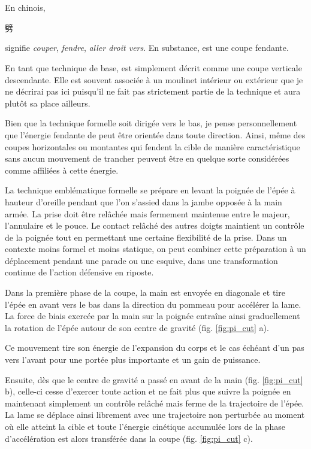 \section{\Pi{}}
En chinois, \Pi{} \begin{CJK*}{UTF8}{bsmi}劈\end{CJK*} signifie \textit{couper}, \textit{fendre}, \textit{aller droit vers}. En substance, \Pi{} est une coupe fendante.

En tant que technique de base, \Pi{} est simplement décrit comme une coupe verticale descendante. Elle est souvent associée à un moulinet intérieur ou extérieur que je ne décrirai pas ici puisqu'il ne fait pas strictement partie de la technique \Pi{} et aura plutôt sa place ailleurs.

Bien que la technique formelle \Pi{} soit dirigée vers le bas, je pense personnellement que l'énergie fendante de \Pi{} peut être orientée dans toute direction. Ainsi, même des coupes horizontales ou montantes qui fendent la cible de manière caractéristique sans aucun mouvement de trancher peuvent être en quelque sorte considérées comme affiliées à cette énergie.

La technique emblématique formelle \Pi{} se prépare en levant la poignée de l'épée à hauteur d'oreille pendant que l'on s'assied dans la jambe opposée à la main armée. La prise doit être relâchée mais fermement maintenue entre le majeur, l'annulaire et le pouce. Le contact relâché des autres doigts maintient un contrôle de la poignée tout en permettant une certaine flexibilité de la prise.
Dans un contexte moins formel et moins statique, on peut combiner cette préparation à un déplacement pendant une parade ou une esquive, dans une transformation continue de l'action défensive en riposte.

Dans la première phase de la coupe, la main est envoyée en diagonale et tire l'épée en avant vers le bas dans la direction du pommeau pour accélérer la lame. La force de biais exercée par la main sur la poignée entraîne ainsi graduellement la rotation de l'épée autour de son centre de gravité (fig. \ref{fig:pi_cut} a).

Ce mouvement tire son énergie de l'expansion du corps et le cas échéant d'un pas vers l'avant pour une portée plus importante et un gain de puissance.

Ensuite, dès que le centre de gravité a passé en avant de la main (fig. \ref{fig:pi_cut} b), celle-ci cesse d'exercer toute action et ne fait plus que suivre la poignée en maintenant simplement un contrôle relâché mais ferme de la trajectoire de l'épée. La lame se déplace ainsi librement avec une trajectoire non perturbée au moment où elle atteint la cible et toute l'énergie cinétique accumulée lors de la phase d'accélération est alors transférée dans la coupe (fig. \ref{fig:pi_cut} c).

